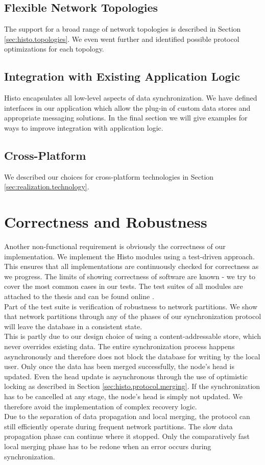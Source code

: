 \subsection*{Flexible Network Topologies}
The support for a broad range of network topologies is described in Section \ref{sec:histo.topologies}.
We even went further and identified possible protocol optimizations for each topology.

\subsection*{Integration with Existing Application Logic}
Histo encapsulates all low-level aspects of data synchronization.
We have defined interfaces in our application which allow the plug-in of custom data stores and appropriate messaging solutions.
In the final section we will give examples for ways to improve integration with application logic.

\subsection*{Cross-Platform}
We described our choices for cross-platform technologies in Section \ref{sec:realization.technology}.

\section{Correctness and Robustness}
Another non-functional requirement is obviously the correctness of our implementation.
We implement the Histo modules using a test-driven approach.
This ensures that all implementations are continuously checked for correctness as we progress.
The limits of showing correctness of software are known - we try to cover the most common cases in our tests.
The test suites of all modules are attached to the thesis and can be found online \cite{histo-source}.
\\

Part of the test suite is verification of robustness to network partitions.
We show that network partitions through any of the phases of our synchronization protocol will leave the database in a consistent state.\\
This is partly due to our design choice of using a content-addressable store, which never overrides existing data.
The entire synchronization process happens asynchronously and therefore does not block the database for writing by the local user.
Only once the data has been merged successfully, the node's head is updated.
Even the head update is asynchronous through the use of optimistic locking as described in Section \ref{sec:histo.protocol.merging}.
If the synchronization has to be cancelled at any stage, the node's head is simply not updated.
We therefore avoid the implementation of complex recovery logic.\\
Due to the separation of data propagation and local merging, the protocol can still efficiently operate during frequent network partitions.
The slow data propagation phase can continue where it stopped.
Only the comparatively fast local merging phase has to be redone when an error occurs during synchronization.


